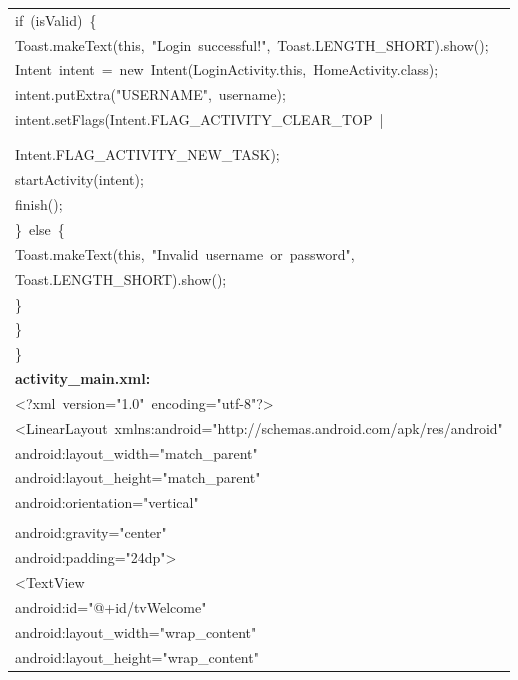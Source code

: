 \documentclass[a4paper,12pt]{article}
\begin{document}
\begin{longtable}{|p{}|}
{\ttfamily\small if\ (isValid)\ \{} \\
{\ttfamily\small Toast.makeText(this,\ "Login\ successful!",\ Toast.LENGTH\_SHORT).show();} \\
{\ttfamily\small Intent\ intent\ =\ new\ Intent(LoginActivity.this,\ HomeActivity.class);} \\
{\ttfamily\small intent.putExtra("USERNAME",\ username);} \\
{\ttfamily\small intent.setFlags(Intent.FLAG\_ACTIVITY\_CLEAR\_TOP\ |} \\
\strut \\
\strut \\
{\ttfamily\small Intent.FLAG\_ACTIVITY\_NEW\_TASK);} \\
{\ttfamily\small startActivity(intent);} \\
{\ttfamily\small finish();} \\
{\ttfamily\small \}\ else\ \{} \\
{\ttfamily\small Toast.makeText(this,\ "Invalid\ username\ or\ password",} \\
{\ttfamily\small Toast.LENGTH\_SHORT).show();} \\
{\ttfamily\small \}} \\
{\ttfamily\small \}} \\
{\ttfamily\small \}} \\
\hline
\rule{0pt}{13pt}\textbf{activity\_main.xml:} \\
\hline
{\ttfamily\small \textless{}?xml\ version="1.0"\ encoding="utf-8"?\textgreater{}} \\
{\ttfamily\small \textless{}LinearLayout\ xmlns:android="http://schemas.android.com/apk/res/android"} \\
{\ttfamily\small android:layout\_width="match\_parent"} \\
{\ttfamily\small android:layout\_height="match\_parent"} \\
{\ttfamily\small android:orientation="vertical"} \\
\strut \\
{\ttfamily\small android:gravity="center"} \\
{\ttfamily\small android:padding="24dp"\textgreater{}} \\
{\ttfamily\small \textless{}TextView} \\
{\ttfamily\small android:id="@+id/tvWelcome"} \\
{\ttfamily\small android:layout\_width="wrap\_content"} \\
{\ttfamily\small android:layout\_height="wrap\_content"} \\

\end{longtable}
\end{document}
